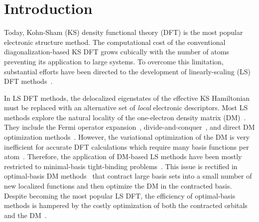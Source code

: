 \documentclass[aps,prl,twocolumn,reprint,amsmath,amssymb]{revtex4-1}
\begin{document}
\section{Introduction}

Today, Kohn-Sham (KS) density functional theory (DFT) is the most popular electronic structure method. 
The computational cost of the conventional diagonalization-based KS DFT grows cubically with the number of atoms preventing its application to large systems. 
To overcome this limitation, substantial efforts have been directed to the development of linearly-scaling (LS) DFT methods~\cite{goedecker1999linear,bowler2012methods}. 

In LS DFT methods, the delocalized eigenstates of the effective KS Hamiltonian must be replaced with an alternative set of \emph{local} electronic descriptors. 
Most LS methods explore the natural locality of the one-electron density matrix (DM)~\cite{li1993density, lee1996linear, li2003density, vandevondele2012linear, kussmann2013linear, aarons2016perspective, shao2003curvy}.  
They include the Fermi operator expansion~\cite{goedecker1994efficient,goedecker1995tight}, divide-and-conquer~\cite{yang1991direct,yang1991local}, and direct DM optimization methods~\cite{li1993density, shao2003curvy, vandevondele2012linear}. 
However, the variational optimization of the DM is very inefficient for accurate DFT calculations which require many basis functions per atom~\cite{goedecker1999linear,vandevondele2012linear, arita2014stable, bowler2012methods, khaliullin2013efficient}.
Therefore, the application of DM-based LS methods have been mostly restricted to minimal-basis tight-binding problems~\cite{Richters2014, goringe1997tight, ratcliff2018band}. 
This issue is rectified in optimal-basis DM methods~\cite{skylaris2005introducing, nakata2015optimized, mohr2015accurate} that contract large basis sets into a small number of new localized functions and then optimize the DM in the contracted basis. 
Despite becoming the most popular LS DFT, the efficiency of optimal-basis methods is hampered by the costly optimization of both the contracted orbitals and the DM~\cite{mostofi2003preconditioned}.
\end{document}
